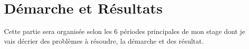 \chapter{Démarche et Résultats}
Cette partie sera organisée selon les 6 périodes principales de mon stage dont je vais décrier des problèmes à résoudre, la démarche et des résultat. 





